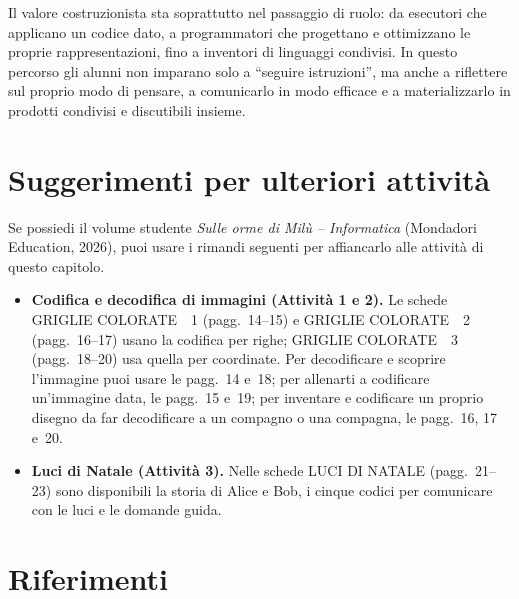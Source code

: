 Il valore costruzionista sta soprattutto nel passaggio di ruolo: da esecutori che applicano un codice dato, a programmatori che progettano e ottimizzano le proprie rappresentazioni, fino a inventori di linguaggi condivisi. In questo percorso gli alunni non imparano solo a ``seguire istruzioni'', ma anche a riflettere sul proprio modo di pensare, a comunicarlo in modo efficace e a materializzarlo in prodotti condivisi e discutibili insieme.

\section{Suggerimenti per ulteriori attività}\label{suggerimenti-per-ulteriori-attivituxe0-e-riferimenti-2}

\printbibliography[heading=none,keyword={cap5},category={attivita}]

\begin{rimandiquaderno}
Se possiedi il volume studente \emph{Sulle orme di Milù -- Informatica}
(Mondadori Education, 2026), puoi usare i rimandi seguenti per affiancarlo
alle attività di questo capitolo.\par\smallskip

\begin{itemize}[leftmargin=*,itemsep=5pt,topsep=4pt]
\item \textbf{Codifica e decodifica di immagini (Attività 1 e 2).} Le schede GRIGLIE COLORATE~\textbullet{}~1 (pagg.~14--15) e GRIGLIE COLORATE~\textbullet{}~2 (pagg.~16--17) usano la codifica per righe; GRIGLIE COLORATE~\textbullet{}~3 (pagg.~18--20) usa quella per coordinate. Per decodificare e scoprire l'immagine puoi usare le pagg.~14 e~18; per allenarti a codificare un'immagine data, le pagg.~15 e~19; per inventare e codificare un proprio disegno da far decodificare a un compagno o una compagna, le pagg.~16, 17 e~20.
\item \textbf{Luci di Natale (Attività 3).} Nelle schede LUCI DI NATALE (pagg.~21--23) sono disponibili la storia di Alice e Bob, i cinque codici per comunicare con le luci e le domande guida.
\end{itemize}
\end{rimandiquaderno}

\section{Riferimenti}\label{riferimenti-cap5}

\printbibliography[heading=none,keyword={cap5},notcategory={attivita}]
